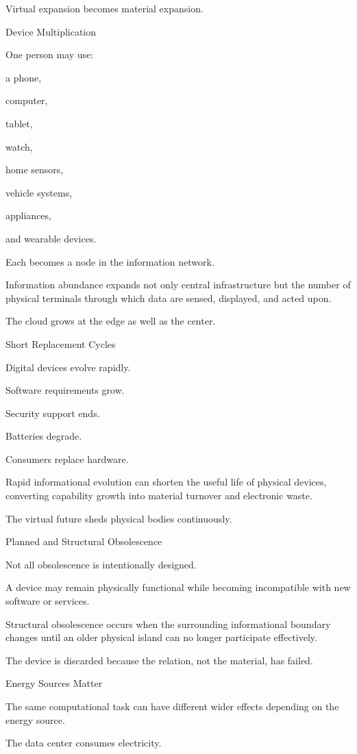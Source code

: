 Virtual expansion becomes material expansion.

Device Multiplication

One person may use:

a phone,

computer,

tablet,

watch,

home sensors,

vehicle systems,

appliances,

and wearable devices.

Each becomes a node in the information network.

Information abundance expands not only central infrastructure but the number of physical terminals through which data are sensed, displayed, and acted upon.

The cloud grows at the edge as well as the center.

Short Replacement Cycles

Digital devices evolve rapidly.

Software requirements grow.

Security support ends.

Batteries degrade.

Consumers replace hardware.

Rapid informational evolution can shorten the useful life of physical devices, converting capability growth into material turnover and electronic waste.

The virtual future sheds physical bodies continuously.

Planned and Structural Obsolescence

Not all obsolescence is intentionally designed.

A device may remain physically functional while becoming incompatible with new software or services.

Structural obsolescence occurs when the surrounding informational boundary changes until an older physical island can no longer participate effectively.

The device is discarded because the relation, not the material, has failed.

Energy Sources Matter

The same computational task can have different wider effects depending on the energy source.

The data center consumes electricity.

